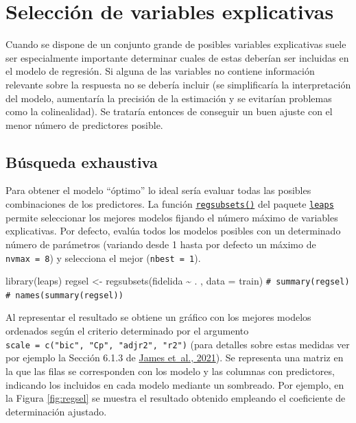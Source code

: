 \documentclass[
]{book}
\newenvironment{Shaded}{\begin{snugshade}}{\end{snugshade}}
\newcommand{\AttributeTok}[1]{\textcolor[rgb]{0.77,0.63,0.00}{#1}}
\newcommand{\CommentTok}[1]{\textcolor[rgb]{0.56,0.35,0.01}{\textit{#1}}}
\newcommand{\FunctionTok}[1]{\textcolor[rgb]{0.00,0.00,0.00}{#1}}
\newcommand{\NormalTok}[1]{#1}
\newcommand{\OtherTok}[1]{\textcolor[rgb]{0.56,0.35,0.01}{#1}}
\newcommand{\SpecialCharTok}[1]{\textcolor[rgb]{0.00,0.00,0.00}{#1}}
\theoremstyle{break}
\theoremstyle{nonumberplain}
\renewcommand{\CommentTok}[1]{\textcolor[rgb]{0.41,0.41,0.41}{\texttt{#1}}}
\begin{document}
\hypertarget{seleccion-reg-lineal}{%
\section{Selección de variables explicativas}\label{seleccion-reg-lineal}}

Cuando se dispone de un conjunto grande de posibles variables explicativas suele ser especialmente importante determinar cuales de estas deberían ser incluidas en el modelo de regresión.
Si alguna de las variables no contiene información relevante sobre la respuesta no se debería incluir (se simplificaría la interpretación del modelo, aumentaría la precisión de la estimación y se evitarían problemas como la colinealidad).
Se trataría entonces de conseguir un buen ajuste con el menor número de predictores posible.

\hypertarget{buxfasqueda-exhaustiva}{%
\subsection{Búsqueda exhaustiva}\label{buxfasqueda-exhaustiva}}

Para obtener el modelo ``óptimo'' lo ideal sería evaluar todas las posibles combinaciones de los predictores.
La función \href{https://rdrr.io/pkg/leaps/man/regsubsets.html}{\texttt{regsubsets()}} del paquete \href{https://CRAN.R-project.org/package=leaps}{\texttt{leaps}} permite seleccionar los mejores modelos fijando el número máximo de variables explicativas.
Por defecto, evalúa todos los modelos posibles con un determinado número de parámetros (variando desde 1 hasta por defecto un máximo de \texttt{nvmax\ =\ 8}) y selecciona el mejor (\texttt{nbest\ =\ 1}).

\begin{Shaded}
\begin{Highlighting}[]
\FunctionTok{library}\NormalTok{(leaps)}
\NormalTok{regsel }\OtherTok{\textless{}{-}} \FunctionTok{regsubsets}\NormalTok{(fidelida }\SpecialCharTok{\textasciitilde{}}\NormalTok{ . , }\AttributeTok{data =}\NormalTok{ train)}
\CommentTok{\# summary(regsel)}
\CommentTok{\# names(summary(regsel))}
\end{Highlighting}
\end{Shaded}

Al representar el resultado se obtiene un gráfico con los mejores modelos ordenados
según el criterio determinado por el argumento \texttt{scale\ =\ c("bic",\ "Cp",\ "adjr2",\ "r2")} (para detalles sobre estas medidas ver por ejemplo la Sección 6.1.3 de \protect\hyperlink{ref-james2021introduction}{James et~al., 2021}).
Se representa una matriz en la que las filas se corresponden con los modelo y las columnas con predictores, indicando los incluidos en cada modelo mediante un sombreado.
Por ejemplo, en la Figura \ref{fig:regsel} se muestra el resultado obtenido empleando el coeficiente de determinación ajustado.
\end{document}
